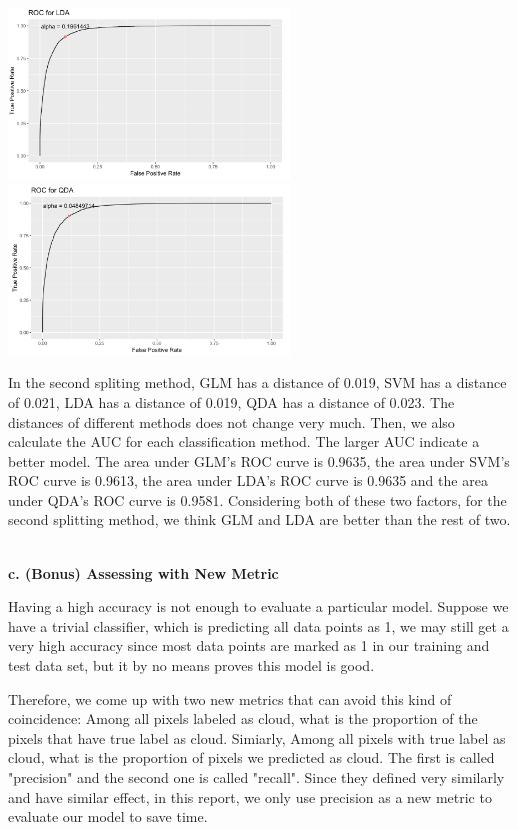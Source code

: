 \documentclass[11pt]{article}
\begin{document}
\includegraphics[width = 7.5cm]{3(b)2-3}
\includegraphics[width = 7.5cm]{3(b)2-4}

In the second spliting method, GLM has a distance of 0.019, SVM has a distance of 0.021, LDA has a distance of 0.019, QDA has a distance of 0.023. The distances of different methods does not change very much. Then, we also calculate the AUC for each classification method. The larger AUC indicate a better model. The area under GLM's ROC curve is 0.9635, the area under SVM's ROC curve is 0.9613, the area under LDA's ROC curve is 0.9635 and the area under QDA's ROC curve is 0.9581. Considering both of these two factors, for the second splitting method, we think GLM and LDA are better than the rest of two.


\vspace{0.3cm}
\mbox{}\\
\textbf{c. (Bonus) Assessing with New Metric}

Having a high accuracy is not enough to evaluate a particular model. Suppose we have a trivial classifier, which is predicting all data points as 1, we may still get a very high accuracy since most data points are marked as 1 in our training and test data set, but it by no means proves this model is good.

Therefore, we come up with two new metrics that can avoid this kind of coincidence: Among all pixels labeled as cloud, what is the proportion of the pixels that have true label as cloud. Simiarly, Among all pixels with true label as cloud, what is the proportion of pixels we predicted as cloud. The first is called "precision" and the second one is called "recall". Since they defined very similarly and have similar effect, in this report, we only use precision as a new metric to evaluate our model to save time.
\end{document}
